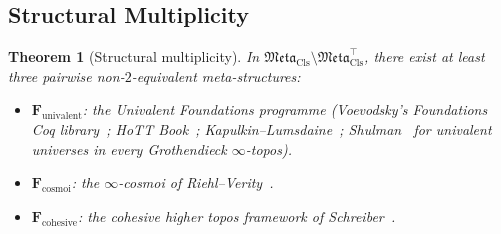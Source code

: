 \documentclass[11pt]{article}
\theoremstyle{plain}
\newtheorem{theorem}{Theorem}[section]
\theoremstyle{definition}
\newcommand{\Meta}{\mathfrak{Meta}}
\begin{document}
\subsection{Structural Multiplicity}

\begin{theorem}[Structural multiplicity]\label{thm:meta-mult}
In $\Meta_{\mathrm{Cls}} \setminus \Meta_{\mathrm{Cls}}^{\top}$, there exist at least three pairwise non-$2$-equivalent meta-structures:
\begin{itemize}
\item $\mathbf{F}_{\mathrm{univalent}}$: the Univalent Foundations programme (Voevodsky's \emph{Foundations} Coq library~\cite{VoevodskyFoundations2010}; HoTT Book~\cite{HoTTBook2013}; Kapulkin--Lumsdaine~\cite{KapulkinLumsdaine2021}; Shulman~\cite{Shulman2019} for univalent universes in every Grothendieck $\infty$-topos).
\item $\mathbf{F}_{\mathrm{cosmoi}}$: the $\infty$-cosmoi of Riehl--Verity~\cite{RiehlVerity2022}.
\item $\mathbf{F}_{\mathrm{cohesive}}$: the cohesive higher topos framework of Schreiber~\cite{Schreiber2013}.
\end{itemize}
\end{theorem}
\end{document}
